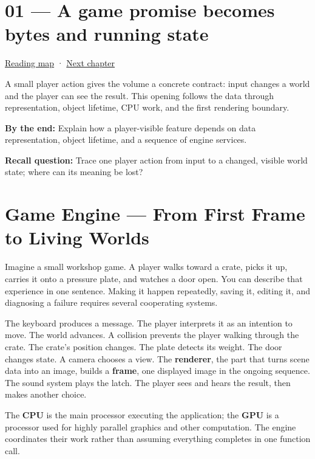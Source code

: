 \hypertarget{05-engine-i-ch001}{}
\chapter{01 --- A game promise becomes bytes and running state}\label{05-engine-i-ch001-a-game-promise-becomes-bytes-and-running-state}

\hyperref[volume-reading-map]{Reading map} · \hyperref[05-engine-i-ch002]{Next chapter}

A small player action gives the volume a concrete contract: input changes a world and the player can see the result. This opening follows the data through representation, object lifetime, CPU work, and the first rendering boundary.

\textbf{By the end:} Explain how a player-visible feature depends on data representation, object lifetime, and a sequence of engine services.

\textbf{Recall question:} Trace one player action from input to a changed, visible world state; where can its meaning be lost?

\chapter{Game Engine --- From First Frame to Living Worlds}\label{05-engine-i-ch001-game-engine-from-first-frame-to-living-worlds}

Imagine a small workshop game. A player walks toward a crate, picks it up, carries it onto a pressure plate, and watches a door open. You can describe that experience in one sentence. Making it happen repeatedly, saving it, editing it, and diagnosing a failure requires several cooperating systems.

The keyboard produces a message. The player interprets it as an intention to move. The world advances. A collision prevents the player walking through the crate. The crate's position changes. The plate detects its weight. The door changes state. A camera chooses a view. The \textbf{renderer}, the part that turns scene data into an image, builds a \textbf{frame}, one displayed image in the ongoing sequence. The sound system plays the latch. The player sees and hears the result, then makes another choice.

The \textbf{CPU} is the main processor executing the application; the \textbf{GPU} is a processor used for highly parallel graphics and other computation. The engine coordinates their work rather than assuming everything completes in one function call.

